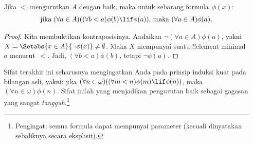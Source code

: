 \documentclass[../../../include/open-logic-section]{subfiles}
\begin{document}
\begin{prop}
Jika $<$ mengurutkan $A$ dengan baik, maka untuk sebarang formula~$\phi(x)$:
\[
	\text{jika }(\forall a \in A)((\forall b < a)\phi(b) \lif 
		\phi(a))\text{, maka }(\forall a \in A)\phi(a).
\]
\end{prop}

\begin{proof}
Kita membuktikan kontraposisinya. Andaikan
$\lnot(\forall a\in A)\phi(a)$, yakni
$X=\Setabs{x\in A}{\lnot\phi(x)}\neq\emptyset$. Maka $X$ mempunyai suatu
!!{element} minimal~$a$ menurut~$<$. Jadi, $(\forall b<a)\phi(b)$, tetapi
$\lnot\phi(a)$.
\end{proof}\noindent
Sifat terakhir ini seharusnya mengingatkan Anda pada prinsip induksi kuat
pada bilangan asli, yakni: jika
$(\forall n\in\omega)((\forall m<n)\phi(m)\lif\phi(n))$, maka
$(\forall n\in\omega)\phi(n)$. Sifat inilah yang menjadikan pengurutan baik
sebagai gagasan yang sangat \emph{tangguh}.\footnote{Pengingat: semua formula
dapat mempunyai parameter (kecuali dinyatakan sebaliknya secara eksplisit).}
\end{document}
